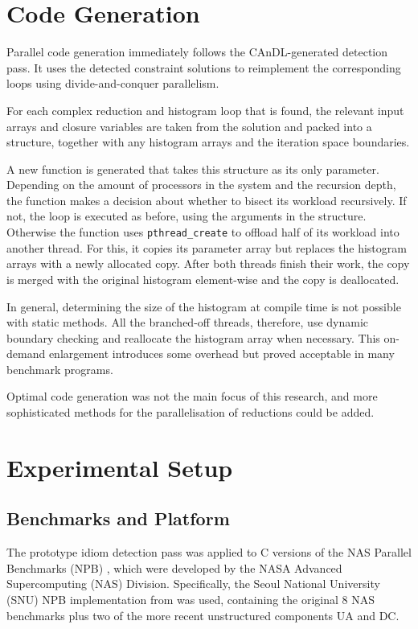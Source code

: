 \section{Code Generation}

    Parallel code generation immediately follows the CAnDL-generated detection
    pass.
    It uses the detected constraint solutions to reimplement the corresponding
    loops using divide-and-conquer parallelism.

    For each complex reduction and histogram loop that is found, the relevant
    input arrays and closure variables are taken from the solution and packed
    into a structure, together with any histogram arrays and the iteration
    space boundaries.

    A new function is generated that takes this structure as its only parameter.
    Depending on the amount of processors in the system and the recursion
    depth, the function makes a decision about whether to bisect its workload
    recursively.
    If not, the loop is executed as before, using the arguments in the
    structure.
    Otherwise the function uses \texttt{pthread\_create} to offload half of its
    workload into another thread.
    For this, it copies its parameter array but replaces the histogram arrays
    with a newly allocated copy.
    After both threads finish their work, the copy is merged with the original
    histogram element-wise and the copy is deallocated.

    In general, determining the size of the histogram at compile time is not
    possible with static methods.
    All the branched-off threads, therefore, use dynamic boundary checking and
    reallocate the histogram array when necessary.
    This on-demand enlargement introduces some overhead but proved acceptable in
    many benchmark programs.

    Optimal code generation was not the main focus of this research, and more
    sophisticated methods for the parallelisation of reductions could be added.

\section{Experimental Setup}

\subsection{Benchmarks and Platform}

    The prototype idiom detection pass was applied to C versions of the
    NAS Parallel Benchmarks (NPB) \citep{Bailey1991NPB}, which were developed
    by the NASA Advanced Supercomputing (NAS) Division.
    Specifically, the Seoul National University (SNU) NPB implementation from
    \citet{seo2011performance} was used, containing the original 8 NAS
    benchmarks plus two of the more recent unstructured components UA and DC.

